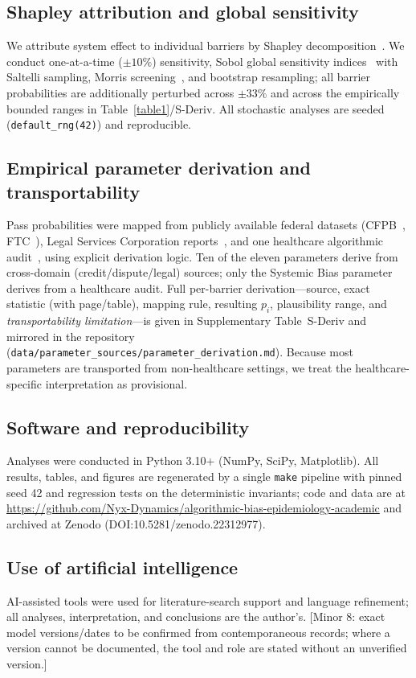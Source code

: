 \documentclass[10pt,letterpaper]{article}
\begin{document}
\subsection*{Shapley attribution and global sensitivity}
We attribute system effect to individual barriers by Shapley decomposition~\cite{bib_shapley}. We conduct one-at-a-time ($\pm10\%$) sensitivity, Sobol global sensitivity indices~\cite{bib_sobol} with Saltelli sampling, Morris screening~\cite{bib_morris}, and bootstrap resampling; all barrier probabilities are additionally perturbed across $\pm33\%$ and across the empirically bounded ranges in Table~\ref{table1}/S-Deriv. All stochastic analyses are seeded (\texttt{default\_rng(42)}) and reproducible.

\subsection*{Empirical parameter derivation and transportability}
Pass probabilities were mapped from publicly available federal datasets (CFPB~\cite{bib_cfpb_credit,bib_cfpb_disputes,bib_cfpb_complaints}, FTC~\cite{bib_ftc}), Legal Services Corporation reports~\cite{bib_lsc}, and one healthcare algorithmic audit~\cite{bib_obermeyer}, using explicit derivation logic. Ten of the eleven parameters derive from cross-domain (credit/dispute/legal) sources; only the Systemic Bias parameter derives from a healthcare audit. Full per-barrier derivation---source, exact statistic (with page/table), mapping rule, resulting $p_i$, plausibility range, and \emph{transportability limitation}---is given in Supplementary Table~S-Deriv and mirrored in the repository (\texttt{data/parameter\_sources/parameter\_derivation.md}). Because most parameters are transported from non-healthcare settings, we treat the healthcare-specific interpretation as provisional.

\subsection*{Software and reproducibility}
Analyses were conducted in Python 3.10+ (NumPy, SciPy, Matplotlib). All results, tables, and figures are regenerated by a single \texttt{make} pipeline with pinned seed 42 and regression tests on the deterministic invariants; code and data are at \url{https://github.com/Nyx-Dynamics/algorithmic-bias-epidemiology-academic} and archived at Zenodo (DOI:10.5281/zenodo.22312977).

\subsection*{Use of artificial intelligence}
AI-assisted tools were used for literature-search support and language refinement; all analyses, interpretation, and conclusions are the author's. [Minor 8: exact model versions/dates to be confirmed from contemporaneous records; where a version cannot be documented, the tool and role are stated without an unverified version.]
\end{document}
